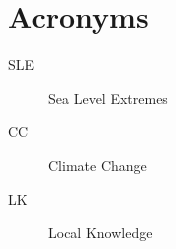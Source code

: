 
\chapter{Acronyms}
\begin{description}
\item[SLE] Sea Level Extremes
\item[CC] Climate Change
\item[LK] Local Knowledge
\end{description}